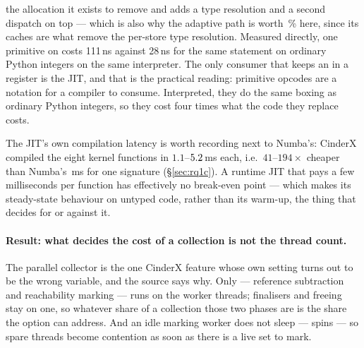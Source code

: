 the allocation it exists to remove and adds a type resolution and a second dispatch on top ---
which is also why the adaptive path is worth \,\% here, since its caches are what remove the
per-store type resolution. Measured directly, one primitive  on 
costs 111\,ns against 28\,ns for the same statement on ordinary Python integers on the same
interpreter. The only consumer that keeps an  in a register is the JIT, and that is
the practical reading: primitive opcodes are a notation for a compiler to consume. Interpreted,
they do the same boxing as ordinary Python integers, so they cost four times what the code they
replace costs.

The JIT's own compilation latency is worth recording next to Numba's: CinderX compiled the
eight kernel functions in $1.1$--$\meas{med:b6_cinderx-fork_jit:jit_force_compile/fork_jit/mandelbrot_py:ms}{5.2}$\,ms each, i.e.\ $41$--$194\times$ cheaper than Numba's
\,ms for one signature (\S\ref{sec:rq1c}). A runtime JIT that pays a few milliseconds per
function has effectively no break-even point --- which makes its steady-state behaviour on
untyped code, rather than its warm-up, the thing that decides for or against it.

\paragraph{Result: what decides the cost of a collection is not the thread count.}
The parallel collector is the one CinderX feature whose own setting turns out to be the wrong
variable, and the source says why. Only  --- reference subtraction and
reachability marking --- runs on the worker threads; finalisers and freeing stay on one, so
whatever share of a collection those two phases are is the share the option can address. And an
idle marking worker does not sleep ---  spins --- so spare threads
become contention as soon as there is a live set to mark.

